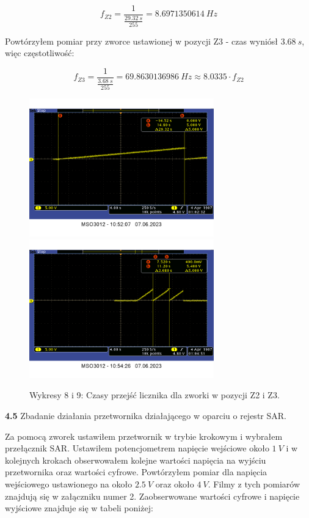 \documentclass[14pt, table]{extarticle}
\begin{document}
$$f_{Z2} = \frac{1}{\frac{29.32 \ s}{255}} = 8.6971350614 \ Hz $$

Powtórzyłem pomiar przy zworce ustawionej w pozycji Z3 - czas wyniósł $3.68 \ s$, więc częstotliwość:

$$f_{Z3} = \frac{1}{\frac{3.68 \ s}{255}} = 69.8630136986 \ Hz \approx 8.0335 \cdot f_{Z2} $$

\begin{figure}[H]
\includegraphics[width=8cm]{A9}
\includegraphics[width=8cm]{A10}
\centering
\captionsetup{labelformat=empty}
\caption{Wykresy 8 i 9: Czasy przejść licznika dla zworki w pozycji Z2 i Z3.}
\end{figure}

\newpage
\textbf{4.5} Zbadanie działania przetwornika działającego w oparciu o rejestr SAR.

Za pomocą zworek ustawiłem przetwornik w trybie krokowym i wybrałem przełącznik SAR. Ustawiłem potencjometrem napięcie wejściowe około $1 \ V$ i w kolejnych krokach obserwowałem kolejne wartości napięcia na wyjściu przetwornika oraz wartości cyfrowe. Powtórzyłem pomiar dla napięcia wejściowego ustawionego na około $2.5 \ V$ oraz około $4 \ V$. Filmy z tych pomiarów znajdują się w załączniku numer 2. Zaobserwowane wartości cyfrowe i napięcie wyjściowe znajduje się w tabeli poniżej:
\end{document}
